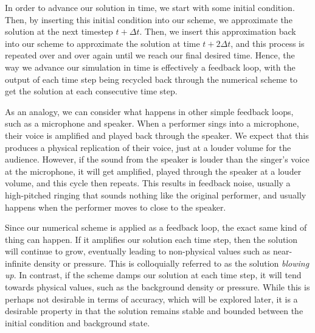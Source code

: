 In order to advance our solution in time, we start with some initial condition. Then, by inserting this initial condition into our scheme, we approximate the solution at the next timestep $t+\Delta t$. Then, we insert this approximation back into our scheme to approximate the solution at time $t+2\Delta t$, and this process is repeated over and over again until we reach our final desired time. Hence, the way we advance our simulation in time is effectively a feedback loop, with the output of each time step being recycled back through the numerical scheme to get the solution at each consecutive time step. 

As an analogy, we can consider what happens in other simple feedback loops, such as a microphone and speaker. When a performer sings into a microphone, their voice is amplified and played back through the speaker. We expect that this produces a physical replication of their voice, just at a louder volume for the audience. However, if the sound from the speaker is louder than the singer's voice at the microphone, it will get amplified, played through the speaker at a louder volume, and this cycle then repeats. This results in feedback noise, usually a high-pitched ringing that sounds nothing like the original performer, and usually happens when the performer moves to close to the speaker.

Since our numerical scheme is applied as a feedback loop, the exact same kind of thing can happen. If it amplifies our solution each time step, then the solution will continue to grow, eventually leading to non-physical values such as near-infinite density or pressure. This is colloquially referred to as the solution {\it blowing up}. In contrast, if the scheme damps our solution at each time step, it will tend towards physical values, such as the background density or pressure. While this is perhaps not desirable in terms of accuracy, which will be explored later, it is a desirable property in that the solution remains stable and bounded between the initial condition and background state.

